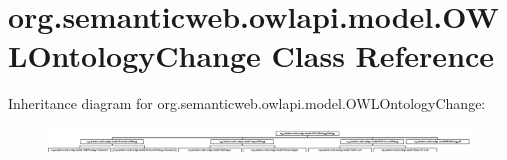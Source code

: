 \hypertarget{classorg_1_1semanticweb_1_1owlapi_1_1model_1_1_o_w_l_ontology_change}{\section{org.\-semanticweb.\-owlapi.\-model.\-O\-W\-L\-Ontology\-Change Class Reference}
\label{classorg_1_1semanticweb_1_1owlapi_1_1model_1_1_o_w_l_ontology_change}
}
Inheritance diagram for org.\-semanticweb.\-owlapi.\-model.\-O\-W\-L\-Ontology\-Change\-:\begin{figure}[H]
\begin{center}
\leavevmode
\includegraphics[height=0.681818cm]{classorg_1_1semanticweb_1_1owlapi_1_1model_1_1_o_w_l_ontology_change}
\end{center}
\end{figure}
